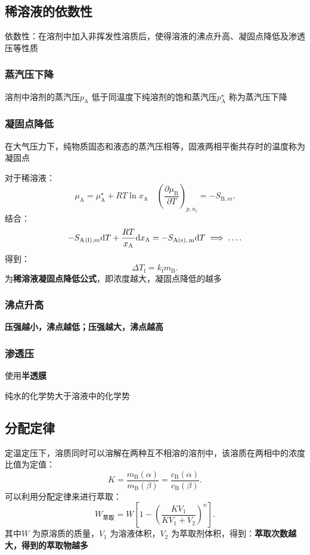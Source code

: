 \subsection{稀溶液的依数性}%
\label{sub:稀溶液的依数性}
\begin{defi}
    依数性：在溶剂中加入非挥发性溶质后，使得溶液的沸点升高、凝固点降低及渗透压等性质
\end{defi}
\subsubsection*{蒸汽压下降}%
\label{subsub*:蒸汽压下降}
溶剂中溶剂的蒸汽压$p_\text{A}$ 低于同温度下纯溶剂的饱和蒸汽压$p_\text{A}^\star $ 称为蒸汽压下降
\subsubsection*{凝固点降低}%
\label{subsub*:凝固点降低}
在大气压力下，纯物质固态和液态的蒸汽压相等，固液两相平衡共存时的温度称为凝固点

对于稀溶液：\[
    \mu_\text{A} = \mu_\text{A}^\star +RT\ln x_\text{A}\quad \left(\frac{\partial \mu_\text{B}}{\partial T}\right)_{p,n_{i}} = -S_{\text{B},m}
.\]
结合：\[
    -S_{\ce{A(l)},m}\mathrm{d}T+\frac{RT}{x_\text{A}}\mathrm{d}x_\text{A}=-S_{\ce{A(s),m}}\mathrm{d}T \implies \ldots 
.\]
得到：\[\boxed{
    \Delta T_\text{f} = k_\text{f}m_\text{B}
.}\]
为\textbf{稀溶液凝固点降低公式}，即浓度越大，凝固点降低的越多
\subsubsection*{沸点升高}%
\label{subsub*:沸点升高}
\textbf{压强越小，沸点越低；压强越大，沸点越高}
\subsubsection*{渗透压}%
\label{subsub*:渗透压}
使用\textbf{半透膜}
\begin{notation}
    纯水的化学势大于溶液中的化学势
\end{notation}
\subsection{分配定律}%
\label{sub:分配定律}
定温定压下，溶质同时可以溶解在两种互不相溶的溶剂中，该溶质在两相中的浓度比值为定值：\[
    K = \frac{m_\text{B}\left( \alpha \right)}{m_\text{B}\left( \beta \right)} = \frac{c_\text{B}\left( \alpha \right)}{c_\text{B}\left( \beta \right)}
.\]
可以利用分配定律来进行萃取：
\[
    W_\text{萃取} = W\left[ 1-\left( \frac{KV_1}{KV_1+V_2} \right)^{n} \right]
.\]
其中$W$ 为原溶质的质量，$V_1$ 为溶液体积，$V_2$ 为萃取剂体积，得到：\textbf{萃取次数越大，得到的萃取物越多}
